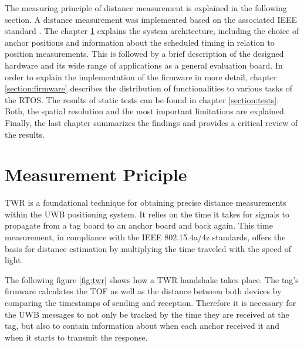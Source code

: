 \documentclass[final, conference, a4paper]{IEEEtran}
\begin{document}
The measuring principle of distance measurement is explained in the following section.
A distance measurement was implemented based on the associated IEEE standard  \cite{IEEE802154a} \cite{IEEE802154z}.
The chapter \ref{Section:principle} explains the system architecture,
including the choice of anchor positions and 
information about the scheduled timing in relation to position measurements.
This is followed by a brief description of the designed hardware and
its wide range of applications as a general evaluation board.
In order to explain the implementation of the firmware in more detail,
chapter \ref{section:firmware} describes the distribution of functionalities to various tasks of the \ac{RTOS}.
The results of static tests can be found in chapter \ref{section:tests}.
Both, the spatial resolution and the most important limitations are explained.
Finally, the last chapter summarizes the findings and provides a critical review of the results.



\section{Measurement Priciple}\label{Section:principle}
\acf{TWR} is a foundational technique for obtaining precise distance measurements within the \ac{UWB} positioning system.
It relies on the time it takes for signals to propagate from a tag board to an anchor board and back again.
This time measurement, in compliance with the IEEE 802.15.4a/4z standards\cite{IEEE802154a}\cite{IEEE802154z}, offers the basis for distance estimation by multiplying the time traveled with the speed of light.

The following figure \ref{fig:twr} shows how a \ac{TWR} handshake takes place.
The tag's firmware calculates the \acf{TOF} as well as the distance between both devices by comparing the timestamps of sending and reception. 
Therefore it is necessary for the \ac{UWB} messages to not only be tracked by the time they are received at the tag, but also to contain information about when each anchor received it and when it starts to transmit the response. 
\end{document}
